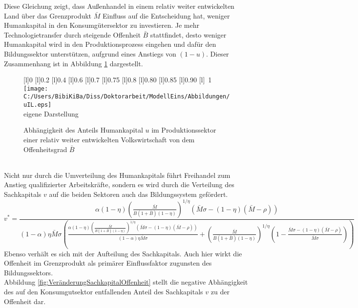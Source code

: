 Diese Gleichung zeigt, dass Au{\ss}enhandel in einem relativ weiter entwickelten Land über das Grenzprodukt $\bar{M}$ Einfluss auf die Entscheidung hat, weniger Humankapital in den Konsumgütersektor zu investieren. Je mehr Technologietransfer durch steigende Offenheit $\bar{B}$ stattfindet, desto weniger Humankapital wird in den Produktionsprozess eingehen und dafür den Bildungssektor unterstützen, aufgrund eines Anstiegs von $(1-u)$. Dieser Zusammenhang ist in Abbildung \ref{fig:VeränderungHumankapitalOffenheit} dargestellt.  \\%
\begin{figure}[htb!] 
\vspace{0.13cm}
 \centering 
		[l]{\footnotesize{0}}
		[l]{\footnotesize{0.2}}
		[l]{\footnotesize{0.4}}
		[l]{\footnotesize{0.6}}
		[l]{\footnotesize{0.7}}
		[l]{\footnotesize{0.75}}
		[l]{\footnotesize{0.8}}
		[l]{\footnotesize{0.80}}
		[l]{\footnotesize{0.85}}
		[l]{\footnotesize{0.90}}
		[l]{~\footnotesize{1}}
\texttt{[image: C:/Users/BibiKiBa/Diss/Doktorarbeit/ModellEins/Abbildungen/uIL.eps]}
\\
\hfill\footnotesize{}  eigene Darstellung
	\caption{Abhängigkeit des Anteils Humankapital $u$ im Produktionssektor einer relativ weiter entwickelten Volkswirtschaft von dem Offenheitsgrad $\bar{B}$}
	\label{fig:VeränderungHumankapitalOffenheit}
\end{figure}
\\
Nicht nur durch die Umverteilung des Humankapitals führt Freihandel zum Anstieg qualifizierter Arbeitskräfte, sondern es wird durch die Verteilung des Sachkapitals $v$ auf die beiden Sektoren auch das Bildungssystem gefördert. 
\begin{equation}
\boxed{
v^*=\frac{\alpha  (1-\eta ) \left(\frac{\bar{M}}{B (1+\bar{B}) (1-\eta )}\right)^{1/\eta } (\bar{M} \sigma -(1-\eta ) (\bar{M}-\rho ))}{(1-\alpha ) \eta  \bar{M} \sigma  \left(\frac{\alpha  (1-\eta ) \left(\frac{\bar{M}}{B (1+\bar{B}) (1-\eta )}\right)^{1/\eta } (\bar{M} \sigma -(1-\eta ) (\bar{M}-\rho ))}{(1-\alpha ) \eta  \bar{M} \sigma }+\left(\frac{\bar{M}}{B (1+\bar{B}) (1-\eta )}\right)^{1/\eta } \left(1-\frac{\bar{M} \sigma -(1-\eta ) (\bar{M}-\rho )}{\bar{M} \sigma }\right)\right)}}
\end{equation}
Ebenso verhält es sich mit der Aufteilung des Sachkapitals. Auch hier wirkt die Offenheit im Grenzprodukt als primärer Einflussfaktor zugunsten des Bildungssektors.\\ Abbildung \ref{fig:VeränderungSachkapitalOffenheit} stellt die negative Abhängigkeit des auf den Konsumgutsektor entfallenden Anteil des Sachkapitals $v$ zu der Offenheit dar. 
